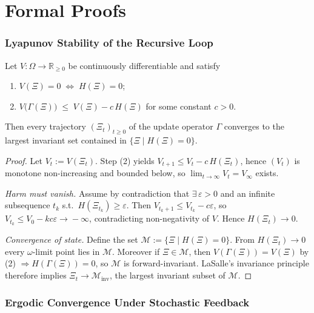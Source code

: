 \appendix
\section*{Formal Proofs}


\subsubsection{Lyapunov Stability of the Recursive Loop}
\label{app:lyap-full}

\begin{theorem}
\label{thm:lyap-full}
Let $V:\Omega\!\to\!\mathbb{R}_{\ge0}$ be continuously differentiable and satisfy
\begin{enumerate}
\item $V(\Xi)=0 \;\Longleftrightarrow\; H(\Xi)=0$;
\item $V\!\bigl(\Gamma(\Xi)\bigr)\;\le\;V(\Xi)-c\,H(\Xi)$ for some constant $c>0$.
\end{enumerate}
Then every trajectory $(\Xi_t)_{t\ge0}$ of the update operator
$\Gamma$ converges to the largest invariant set contained in
$\{\Xi\mid H(\Xi)=0\}$.  \end{theorem}

\begin{proof}
Let $V_t := V(\Xi_t)$.  Step (2) yields
$V_{t+1} \le V_t - c\, H(\Xi_t)$, hence $(V_t)$ is
monotone non-increasing and bounded below, so $\lim_{t\to\infty}V_t = V_\infty$ exists.

\smallskip
\noindent\emph{Harm must vanish.}  
Assume by contradiction that
$\exists\,\varepsilon>0$ and an infinite subsequence $t_k$ s.t.\
$H(\Xi_{t_k})\ge\varepsilon$.
Then $V_{t_k+1}\le V_{t_k}-c\varepsilon$, so
$V_{t_k}\le V_0-kc\varepsilon\!\to\!-\infty$, contradicting
non-negativity of $V$.  Hence $H(\Xi_t)\!\to\!0$.

\smallskip
\noindent\emph{Convergence of state.}  
Define the set $\mathcal{M}:=\{\Xi\mid H(\Xi)=0\}$.
From $H(\Xi_t)\to0$ every $\omega$-limit point lies in $\mathcal{M}$.
Moreover if $\Xi\in\mathcal{M}$, then $V(\Gamma(\Xi))=V(\Xi)$ by (2)
$\Rightarrow H(\Gamma(\Xi))=0$, so $\mathcal{M}$ is forward-invariant.
LaSalle’s invariance principle therefore implies
$\Xi_t \to \mathcal{M}_\mathrm{inv}$,
the largest invariant subset of $\mathcal{M}$.
\end{proof}


\subsubsection{Ergodic Convergence Under Stochastic Feedback}
\label{app:ergodic-full}

